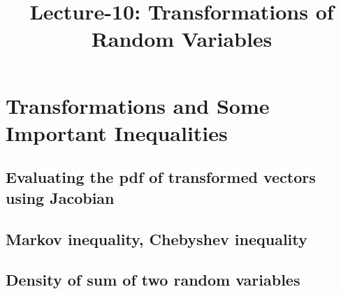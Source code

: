 \documentclass[a4paper,10pt,english]{article}
\title{Lecture-10: Transformations of Random Variables}
\author{}
\begin{document}
\maketitle

\section{Transformations and Some Important Inequalities}
\subsection{Evaluating the pdf of transformed vectors using Jacobian}
\subsection{Markov inequality, Chebyshev inequality}
\subsection{Density of sum of two random variables}
\end{document}
